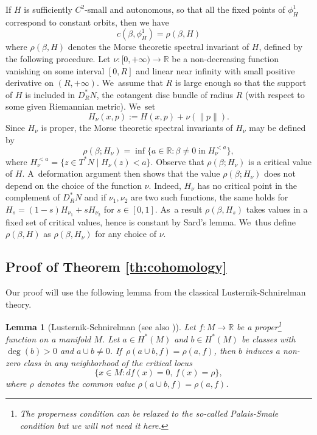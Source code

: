 \documentclass[10pt,a4paper]{amsart}
\newtheorem{lem}[thm]{Lemma}
\theoremstyle{definition}
\newcommand{\R}{\mathbb{R}}
\begin{document}
If $H$ is sufficiently $C^2$-small and autonomous, so that all the fixed points of $\phi_H^1$ correspond to constant orbits, then we have
\begin{equation}
\label{eq:spectral-morse}
c(\beta, \phi_H^1)=\rho(\beta, H)
\end{equation}
where $\rho(\beta, H)$ denotes the Morse theoretic spectral invariant of $H$, defined by the following procedure.
Let $\nu:[0, +\infty)\to\R$ be a non-decreasing function vanishing on some interval $[0,R]$ and linear near infinity with small positive derivative on $(R,+\infty)$. We~assume that $R$ is large enough so that the support of $H$ is included in $D_R^*N$, the cotangent disc bundle of radius $R$ (with respect to some given Riemannian metric). We~set\vspace*{-3pt}
\begin{equation}
\label{eq:H_nu}
H_\nu(x,p):=H(x,p)+\nu(\|p\|).
\end{equation}
Since $H_\nu$ is proper, the Morse theoretic spectral invariants of $H_\nu$ may be defined by\vspace*{-3pt}
\[
\rho(\beta;H_\nu)=\inf\bigl\{a\in\R: \beta \neq 0 \; \text{in}\; H_\nu^{<a} \bigr\},
\]
where $H_\nu^{<a}=\{z \in T^*N \mid H_\nu(z)<a\}$.
Observe that $\rho(\beta;H_\nu)$ is a critical value of $H$. A~deformation argument then shows that the value $\rho(\beta;H_\nu)$ does not depend on the choice of the function $\nu$. Indeed, $H_\nu$ has no critical point in the complement of $D_R^*N$ and if $\nu_1,\nu_2$ are two such functions, the same holds for $H_s=(1-s)H_{\nu_1}+s H_{\nu_2}$ for $s\in[0,1]$. As~a result $\rho(\beta,H_s)$ takes values in a fixed set of critical values, hence is constant by Sard's lemma. We~thus define $\rho(\beta, H)$ as $\rho(\beta, H_\nu)$ for any choice of $\nu$.

\subsection{Proof of Theorem \ref{th:cohomology}}\label{sec:proof-cohomology}

Our proof will use the following lemma from the classical Lusternik-Schnirelman theory.

\begin{lem}[Lusternik-Schnirelman \cite{Lusternik-Schnirelman}(see also \cite{Viterbo-Montreal})]\label{lem:Lusternik-Schnirelman} Let $f:M\to\R$ be a proper\footnote{The properness condition can be relaxed to the so-called Palais-Smale condition but we will not need it here.} function on a manifold $M$. Let $a\in H^*(M)$ and $b\in H^*(M)$ be classes with $\deg(b)>0$ and $a\cup b\neq 0$. If~$\rho(a\cup b,f)=\rho(a, f)$, then $b$ induces a non-zero class in any neighborhood of the critical locus\vspace*{-3pt}
\[
\{x\in M: df(x)=0,\, f(x)=\rho\},
\]
where $\rho$ denotes the common value $\rho(a\cup b,f)=\rho(a, f)$.
\end{lem}
\end{document}
